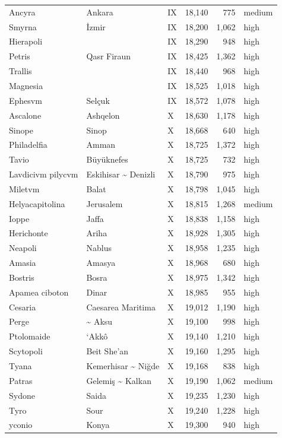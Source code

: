 \documentclass[11pt,a4paper]{article}
\begin{document}
{\begin{longtable}{p{4.6cm}p{5.2cm}lrrl}
Ancyra & Ankara & IX & 18,140 & 775 & medium\\
Smyrna & İzmir & IX & 18,200 & 1,062 & high\\
Hierapoli &  & IX & 18,290 & 948 & high\\
Petris & Qasr Firaun & IX & 18,425 & 1,362 & high\\
Trallis &  & IX & 18,440 & 968 & high\\
Magnesia &  & IX & 18,525 & 1,018 & high\\
Ephesvm & Selçuk & IX & 18,572 & 1,078 & high\\
Ascalone & Ashqelon & X & 18,630 & 1,178 & high\\
Sinope & Sinop & X & 18,668 & 640 & high\\
Philadelfia & Amman & X & 18,725 & 1,372 & high\\
Tavio & Büyüknefes & X & 18,725 & 732 & high\\
Lavdicivm pilycvm & Eskihisar \textasciitilde{} Denizli & X & 18,790 & 975 & high\\
Miletvm & Balat & X & 18,798 & 1,045 & high\\
Helyacapitolina & Jerusalem & X & 18,815 & 1,268 & medium\\
Ioppe & Jaffa & X & 18,838 & 1,158 & high\\
Herichonte & Ariha & X & 18,928 & 1,305 & high\\
Neapoli & Nablus & X & 18,958 & 1,235 & high\\
Amasia & Amasya & X & 18,968 & 680 & high\\
Bostris & Bosra & X & 18,975 & 1,342 & high\\
Apamea ciboton & Dinar & X & 18,985 & 955 & high\\
Cesaria & Caesarea Maritima & X & 19,012 & 1,190 & high\\
Perge & \textasciitilde{} Aksu & X & 19,100 & 998 & high\\
Ptolomaide & ‘Akkô & X & 19,140 & 1,210 & high\\
Scytopoli & Beit She'an & X & 19,160 & 1,295 & high\\
Tyana & Kemerhisar \textasciitilde{} Niğde & X & 19,168 & 838 & high\\
Patras & Gelemiş \textasciitilde{} Kalkan & X & 19,190 & 1,062 & medium\\
Sydone & Saida & X & 19,235 & 1,230 & high\\
Tyro & Sour & X & 19,240 & 1,228 & high\\
yconio & Konya & X & 19,300 & 940 & high\\

\end{longtable}}
\end{document}
